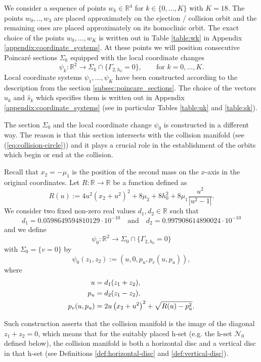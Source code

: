 \documentclass[1p]{article}
\begin{document}
We consider a sequence of points $w_k\in \mathbb{R}^4$ for  $k \in \{ 0, ..., K \}$ with $K = 18$. The points $w_0, .., w_3$ are placed approximately on the ejection / collision orbit and the remaining ones are placed approximately on its homoclinic orbit. The exact choice of the points $w_0,\ldots, w_K$ is written out in Table \ref{table:wk} in Appendix \ref{appendix:coordinate_systems}. At these points we will position consecutive Poincar\'e sections $\Sigma_k$ equipped with the local coordinate changes 
\[
    \psi_{k}:\mathbb{R}^{2}\to\Sigma_{k}\cap\{ \Gamma_{2,h_{0}} = 0\}, \qquad \mbox{for }k=0,\ldots,K.
\]
Local coordinate systems $\psi_1, ..., \psi_K$ have been constructed according to the description from the section \ref{subsec:poincare_sections}. The choice of the vectors $\hat u_k$ and $\hat s_k$ which specifies them is written out in Appendix \ref{appendix:coordinate_systems} (see in particular Tables \ref{table:uk} and \ref{table:sk}).

The section $\Sigma_0$ and the local coordinate change $\psi_0$ is constructed in a different way. The reason is that this section intersects with the collision manifold (see (\ref{eq:collision-circle})) and it plays a crucial role in the establishment of the orbits which begin or end at the collision.

Recall that $x_2= -\mu_1$ is the position of the second mass on the $x$-axis in the original coordinates. Let $R:\mathbb{R}\to \mathbb{R}$ be a function defined as
\begin{equation}
    \label{eq:R-def}
	R(u) := 4u^2 \left( x_{2} + u^{2} \right)^2 + 8\mu_{2} + 8 h_0^{2} + 8 \mu_{1} \frac{ u^{2} }{ |u^{2}-1| }. 
\end{equation}
We consider two fixed non-zero real values $d_1,d_2\in \mathbb{R}$ such that
\[
    d_1= 0.0598649594810129 \cdot 10^{-10} \quad \mbox{and}\quad
    d_2 = 0.997908614890024 \cdot 10^{-10}
\]
and we define
\[
	\psi_0 : \mathbb{R}^2 \to \Sigma_0 \cap \{ \Gamma_{2,h_0}=0 \}
\]
with $\Sigma_0 = \{v=0\}$ by
\[
    \psi_0 (z_1, z_2) := (u, 0, p_u, p_v(u,p_u)),
\]
where  
 \begin{align}
    u &= d_1  (z_1 + z_2), \notag \\
    p_u &= d_2  (z_1 - z_2), \label{eq:psi_0-def}\\
    p_v(u,p_u) &= 2u \left( x_2 + u^2 \right)^2 + \sqrt{ R(u) - p_u^2 }.\notag
\end{align}

Such construction asserts that the collision manifold is the image of the diagonal $z_1 + z_2 = 0$, which means that for the suitably placed h-set (e.g. the h-set $\mathcal{N}_0$ defined below), the collision manifold is both a horizontal disc and a vertical disc in that h-set (see Definitions \ref{def:horizontal-disc} and \ref{def:vertical-disc}).
\end{document}
